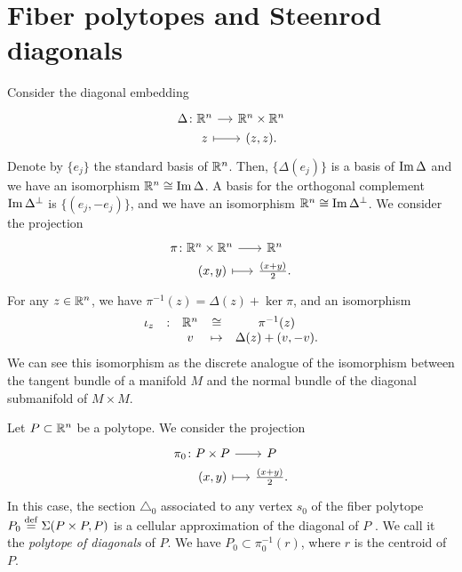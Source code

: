 
\section{Fiber polytopes and Steenrod diagonals} \label{s:fiber polytopes and Steenrod diagonals}

Consider the diagonal embedding
\[
\begin{tikzcd}[row sep=0, column sep=small]
\Delta \colon \R^n \arrow{r} & \R^n \times \R^n \\
\phantom{\Delta \colon} z \arrow[r, |->] & (z,z).
\end{tikzcd}
\]
Denote by $\{e_j\}$ the standard basis of $\mathbb{R}^n$. 
Then, $\{\Delta (e_j)\}$ is a basis of $\operatorname{\mathrm{Im}} \Delta$ and we have an isomorphism $\mathbb{R}^n \cong \operatorname{\mathrm{Im}} \Delta$. 
A basis for the orthogonal complement $\operatorname{\mathrm{Im}} \Delta^{\bot}$ is $\{(e_j,-e_j)\}$, and we have an isomorphism $\mathbb{R}^n \cong \operatorname{\mathrm{Im}} \Delta^{\bot}$. 
We consider the projection 
\[
\begin{tikzcd}[row sep=0, column sep=small]
\pi \colon \R^n \times \R^n \arrow{r} & \R^n \\
\phantom{\pi_0 \colon} (x,y) \arrow[r, |->] & \frac{(x+y)}{2}.
\end{tikzcd}
\]
For any $z \in \mathbb{R}^n$, we have $\pi^{-1}(z)=\Delta(z)+\ker \pi$, and an isomorphism
\begin{equation*}
\begin{matrix}
 \iota_z & : & \mathbb{R}^n  & \cong & \pi^{-1}(z) \\
 & & v  & \mapsto & \Delta(z)+(v,-v).
\end{matrix}
\end{equation*}
We can see this isomorphism as the discrete analogue of the isomorphism between the tangent bundle of a manifold $M$ and the normal bundle of the diagonal submanifold of $M\times M$. 

Let $P \subset \mathbb{R}^n$ be a polytope. We consider the projection
\[
\begin{tikzcd}[row sep=0, column sep=small]
\pi_0 \colon P \times P \arrow{r} & P \\
\phantom{\pi_0 \colon} (x,y) \arrow[r, |->] & \frac{(x+y)}{2}.
\end{tikzcd}
\]
In this case, the section $\triangle_0$ associated to any vertex $s_0$ of the fiber polytope $P_0 \stackrel{\mathrm{def}}{=} \Sigma(P \times P,P)$ is a cellular approximation of the diagonal of $P$ \cite[Proposition 5]{MTTV19}. 
We call it the \emph{polytope of diagonals} of $P$.
We have $P_0 \subset \pi_0^{-1}(r)$, where $r$ is the centroid of $P$.

